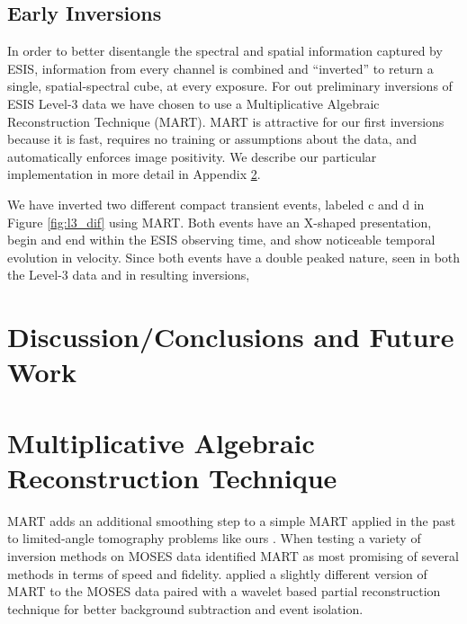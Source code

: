     
    \subsection{Early Inversions}
    	In order to better disentangle the spectral and spatial information captured by ESIS, information from every channel is combined and ``inverted'' to return a single, spatial-spectral cube, at every exposure.
    	For out preliminary inversions of ESIS Level-3 data we have chosen to use a Multiplicative Algebraic Reconstruction Technique (MART).
    	MART is attractive for our first inversions because it is fast, requires no training or assumptions about the data, and automatically enforces image  positivity.
    	We describe our particular implementation in more detail in Appendix \ref{MART}.
    	
    	\begin{figure}[htb!]
    		\centering
    		\caption{}
    		\label{fig:perfect_x_inverted}
    	\end{figure}
    	
    	We have inverted two different compact transient events, labeled c and d in Figure \ref{fig:l3_dif} using MART.
    	Both events have an X-shaped presentation, begin and end within the ESIS observing time, and show noticeable temporal evolution in velocity.
    	Since both events have a double peaked nature, seen in both the Level-3 data and in resulting inversions, 
    	
    
    	
    	
    			
    		   	
    	
\section{Discussion/Conclusions and Future Work}





\appendix
\section{Multiplicative Algebraic Reconstruction Technique}\label{MART}
	MART adds an additional smoothing step to a simple MART applied in the past to limited-angle tomography problems like ours \citep{Okamoto1991,Verhoeven1993}.
	When testing a variety of inversion methods on MOSES data \citet{FoxPhD} identified MART as most promising of several methods in terms of speed and fidelity.
	\citet{RustPhD} applied a slightly different version of MART to the MOSES data paired with a wavelet based partial reconstruction technique for better background subtraction and event isolation.
	

